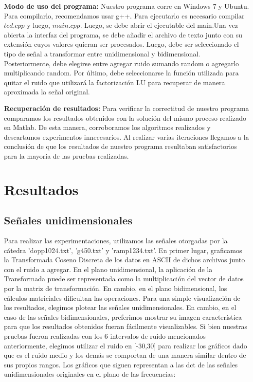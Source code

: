\documentclass[10pt, a4paper]{article}
\begin{document}
\begin{itemize}
\large{\textbf{Modo de uso del programa:}} 
Nuestro programa corre en Windows 7 y Ubuntu. Para compilarlo, recomendamos usar g++. Para ejecutarlo es necesario compilar $tcd.cpp$ y luego, $main.cpp$. Luego, se debe abrir el ejecutable del main.\newline Una vez abierta la interfaz del programa, se debe añadir el archivo de texto junto con su extensión cuyos valores quieran ser procesados. Luego, debe ser seleccionado el tipo de señal a transformar entre unidimensional y bidimensional. Posteriormente, debe elegirse entre agregar ruido sumando random o agregarlo multiplicando random. Por último, debe seleccionarse la función utilizada para quitar el ruido que utilizará la factorización LU para recuperar de manera aproximada la señal original.\newline

\large{\textbf{Recuperaci\'on de resultados:}} Para verificar la correctitud de nuestro programa comparamos los resultados obtenidos con la solución del mismo proceso realizado en Matlab. De esta manera, corroboramos los algoritmos realizados y descartamos experimentos innecesarios. Al realizar varias iteraciones llegamos a la conclusi\'on de que los resultados de nuestro programa resultaban satisfactorios para la mayor\'ia de las pruebas realizadas.\newline

\section{Resultados}
	
\subsection{Señales unidimensionales}
Para realizar las experimentaciones, utilizamos las señales otorgadas por la cátedra 'dopp1024.txt', 'g450.txt' y 'ramp1234.txt'. En primer lugar, graficamos la Transformada Coseno Discreta de los datos en ASCII de dichos archivos junto con el ruido a agregar. En el plano unidimensional, la aplicación de la Transformada puede ser representada como la multiplicación del vector de datos por la matriz de transformación. En cambio, en el plano bidimensional, los cálculos matriciales dificultan las operaciones. Para una simple visualización de los resultados, elegimos plotear las señales unidimensionales. En cambio, en el caso de las señales bidimensionales, preferimos mostrar su imagen característica para que los resultados obtenidos fueran fácilmente visualizables. Si bien nuestras pruebas fueron realizadas con los 6 intervalos de ruido mencionados anteriormente, elegimos utilizar el ruido en [-30,30] para realizar los gráficos dado que es el ruido medio y los demás se comportan de una manera similar dentro de sus propios rangos. Los gráficos que siguen representan a las dct de las señales unidimensionales originales en el plano de las frecuencias:
\newline


\end{itemize}
\end{document}
